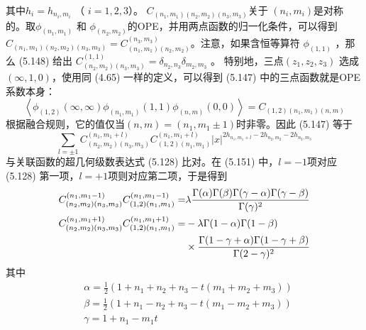 其中$ h_{i}=h_{n_{i}, m_{i}}$ （ $i=1,2,3 $）。 $C_{\left(n_{1}, m_{1}\right)\left(n_{2}, m_{2}\right)\left(n_{3}, m_{3}\right)} $关于 $(n_i,m_i) $是对称的。取$ \phi_{\left(n_{1}, m_{1}\right)}$ 和 $\phi_{\left(n_{2}, m_{2}\right)} $的OPE，并用两点函数的归一化条件，可以得到 $C_{\left(n_{1}, m_{1}\right)\left(n_{2}, m_{2}\right)\left(n_{3}, m_{3}\right)}=C_{\left(n_{1}, m_{1}\right)\left(n_{2}, m_{2}\right)}^{\left(n_{3}, m_{3}\right)} $。注意，如果含恒等算符 $\phi_{(1,1)}$ ，那么 (5.148) 给出 $C_{\left(n_{2}, m_{2}\right)\left(n_{3}, m_{3}\right)}^{(1,1)}=\delta_{n_{2}, n_{3}} \delta_{m_{2}, m_{3}}$ 。
特别地，三点$ (z_1,z_2,z_3)$ 选成$ (\infty, 1,0) $，使用同 (4.65) 一样的定义，可以得到 (5.147) 中的三点函数就是OPE系数本身：
\begin{equation}
\left\langle\phi_{(1,2)}(\infty, \infty) \phi_{\left(n_{1}, m_{1}\right)}(1,1) \phi_{(n, m)}(0,0)\right\rangle=C_{(1,2)\left(n_{1}, m_{1}\right)(n, m)}
\end{equation} 
根据融合规则，它的值仅当$ (n, m)=\left(n_{1}, m_{1} \pm 1\right) $时非零。因此 (5.147) 等于
\begin{equation}
	\sum_{l=\pm 1} C_{\left(n_{2}, m_{2}\right)\left(n_{3}, m_{3}\right)}^{\left(n_{1}, m_{1}+l\right)} C_{(1,2)\left(n_{1}, m_{1}\right)}^{\left(n_{1}, m_{1}+l\right)}|x|^{2 h_{n_1, m_1+l}-2 h_{n_{2}, m_{2}}-2 h_{n_{3}, m_{3}}}
\end{equation}
与关联函数的超几何级数表达式 (5.128) 比对。在 (5.151) 中，$ l=-1 $项对应 (5.128) 第一项，$ l=+1 $项则对应第二项，于是得到
\begin{align} C_{\left(n_{2}, m_{2}\right)\left(n_{3}, m_{3}\right)}^{\left(n_{1}, m_{1}-1\right)} C_{(1,2)\left(n_{1}, m_{1}\right)}^{\left(n_{1}, m_{1}-1\right)}=& \lambda \frac{\Gamma(\alpha) \Gamma(\beta) \Gamma(\gamma-\alpha) \Gamma(\gamma-\beta)}{\Gamma(\gamma)^{2}} \\ C_{\left(n_{2}, m_{2}\right)\left(n_{3}, m_{3}\right)}^{\left(n_{1}, m_{1}+1\right)} C_{(1,2)\left(n_{1}, m_{1}\right)}^{\left(n_{1}, m_{1}+1\right)}=&-\lambda \Gamma(1-\alpha) \Gamma(1-\beta) \notag\\ & \times \frac{\Gamma(1-\gamma+\alpha) \Gamma(1-\gamma+\beta)}{\Gamma(2-\gamma)^{2}} \end{align}
其中
\begin{align} &\alpha=\frac{1}{2}\left(1+n_{1}+n_{2}+n_{3}-t\left(m_{1}+m_{2}+m_{3}\right)\right)\\ &\beta=\frac{1}{2}\left(1+n_{1}-n_{2}+n_{3}-t\left(m_{1}-m_{2}+m_{3}\right)\right)\\ &\gamma=1+n_{1}-m_{1} t \end{align}

